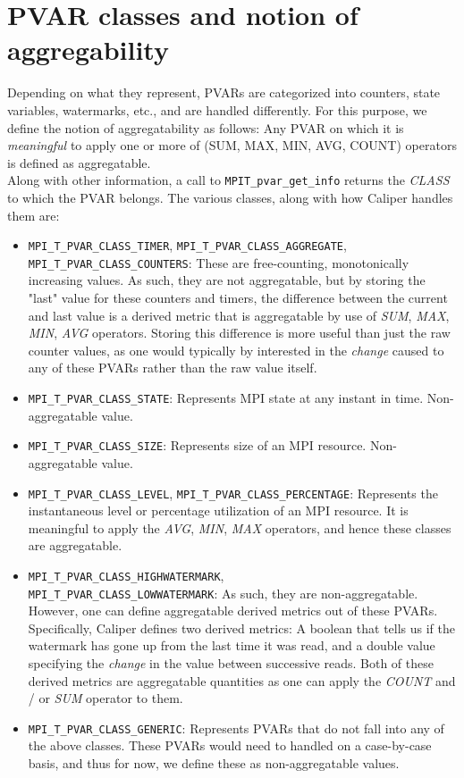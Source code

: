 \section{PVAR classes and notion of aggregability}
Depending on what they represent, PVARs are categorized into counters, state variables, watermarks, etc., and are handled differently. For this purpose, we define the notion of aggregatability as follows: Any PVAR on which it is \emph{meaningful} to apply one or more of (SUM, MAX, MIN, AVG, COUNT) operators is defined as aggregatable.\\
Along with other information, a call to \verb+MPIT_pvar_get_info+ returns the \emph{CLASS} to which the PVAR belongs. The various classes, along with how Caliper handles them are:
\begin{itemize}
	\item \verb+MPI_T_PVAR_CLASS_TIMER+, \verb+MPI_T_PVAR_CLASS_AGGREGATE+, \\\verb+MPI_T_PVAR_CLASS_COUNTERS+: These are free-counting, monotonically increasing values. As such, they are not aggregatable, but by storing the "last" value for these counters and timers, the difference between the current and last value is a derived metric that is aggregatable by use of \emph{SUM}, \emph{MAX}, \emph{MIN}, \emph{AVG} operators. Storing this difference is more useful than just the raw counter values, as one would typically by interested in the \emph{change} caused to any of these PVARs rather than the raw value itself.
	\item \verb+MPI_T_PVAR_CLASS_STATE+: Represents MPI state at any instant in time. Non-aggregatable value.
	\item \verb+MPI_T_PVAR_CLASS_SIZE+: Represents size of an MPI resource. Non-aggregatable value.
	\item \verb+MPI_T_PVAR_CLASS_LEVEL+, \verb+MPI_T_PVAR_CLASS_PERCENTAGE+: Represents the instantaneous level or percentage utilization of an MPI resource. It is meaningful to apply the \emph{AVG}, \emph{MIN}, \emph{MAX} operators, and hence these classes are aggregatable.
	\item \verb+MPI_T_PVAR_CLASS_HIGHWATERMARK+, \\\verb+MPI_T_PVAR_CLASS_LOWWATERMARK+: As such, they are non-aggregatable. However, one can define aggregatable derived metrics out of these PVARs. Specifically, Caliper defines two derived metrics: A boolean that tells us if the watermark has gone up from the last time it was read, and a double value specifying the \emph{change} in the value between successive reads. Both of these derived metrics are aggregatable quantities as one can apply the \emph{COUNT} and / or \emph{SUM} operator to them.
	\item \verb+MPI_T_PVAR_CLASS_GENERIC+: Represents PVARs that do not fall into any of the above classes. These PVARs would need to handled on a case-by-case basis, and thus for now, we define these as non-aggregatable values.
\end{itemize}

